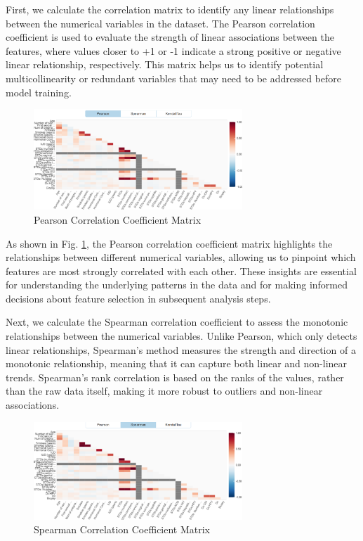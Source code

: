 \documentclass{llncs}
\begin{document}
First, we calculate the correlation matrix to identify any linear relationships between the numerical variables in the dataset. The Pearson correlation coefficient is used to evaluate the strength of linear associations between the features, where values closer to +1 or -1 indicate a strong positive or negative linear relationship, respectively. This matrix helps us to identify potential multicollinearity or redundant variables that may need to be addressed before model training.

\begin{figure}[htbp]
	\centering
	\includegraphics[width=0.7\textwidth]{images/pearson_correlation.png}
	\caption{Pearson Correlation Coefficient Matrix}
	\label{fig:pearson_corr}
\end{figure}


As shown in Fig. \ref{fig:pearson_corr}, the Pearson correlation coefficient matrix highlights the relationships between different numerical variables, allowing us to pinpoint which features are most strongly correlated with each other. These insights are essential for understanding the underlying patterns in the data and for making informed decisions about feature selection in subsequent analysis steps.


Next, we calculate the Spearman correlation coefficient to assess the monotonic relationships between the numerical variables. Unlike Pearson, which only detects linear relationships, Spearman’s method measures the strength and direction of a monotonic relationship, meaning that it can capture both linear and non-linear trends. Spearman's rank correlation is based on the ranks of the values, rather than the raw data itself, making it more robust to outliers and non-linear associations.

\begin{figure}[htbp]
	\centering
	\includegraphics[width=0.7\textwidth]{images/spearman_correlation.png}
	\caption{Spearman Correlation Coefficient Matrix}
	\label{fig:spearman_corr}
\end{figure}
\end{document}
